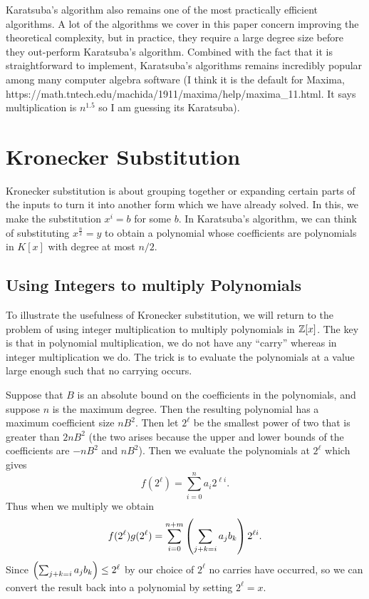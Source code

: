 Karatsuba's algorithm also remains one of the most practically efficient algorithms. A lot of the algorithms we cover in this paper concern improving the theoretical complexity, but in practice, they require a large degree size before they out-perform Karatsuba's algorithm. Combined with the fact that it is straightforward to implement, Karatsuba's algorithms remains incredibly popular among many computer algebra software (I think it is the default for Maxima, https://math.tntech.edu/machida/1911/maxima/help/maxima_11.html. It says multiplication is $n^{1.5}$ so I am guessing its Karatsuba).


\section{Kronecker Substitution}%
\label{sub:kronecker_substitution}

Kronecker substitution is about grouping together or expanding certain parts of the inputs to turn it into another form which we have already solved. In this, we make the substitution $x^i = b$ for some $b$. In Karatsuba's algorithm, we can think of substituting $x^{\frac{n}{2}} = y$ to obtain a polynomial whose coefficients are polynomials in $K[x]$ with degree at most $n/2$.

\subsection{Using Integers to multiply Polynomials}%
\label{sub:Using Integers to multiply Polynomials}

To illustrate the usefulness of Kronecker substitution, we will return to the problem of using integer multiplication to multiply polynomials in ${\mathbb Z}[x]$. The key is that in polynomial multiplication, we do not have any ``carry'' whereas in integer multiplication we do. The trick is to evaluate the polynomials at a value large enough such that no carrying occurs.

Suppose that $B$ is an absolute bound on the coefficients in the polynomials, and suppose $n$ is the maximum degree. Then the resulting polynomial has a maximum coefficient size $nB^2$. Then let $2^\ell$ be the smallest power of two that is greater than $2nB^2$ (the two arises because the upper and lower bounds of the coefficients are $-nB^2$ and $nB^2$). Then we evaluate the polynomials at $2^\ell$ which gives
\[
    f(2^\ell) = \sum^n_{i = 0} a_i 2^{\ell i}.
\]
Thus when we multiply we obtain
\[
    f(2^\ell)g(2^\ell) = \sum^{n+m}_{i=0} \left(\sum_{j + k = i} a_jb_k\right)2^{\ell i}.
\]
Since $\left(\sum_{j + k = i}a_j b_k\right) \leq 2^{\ell}$ by our choice of $2^\ell$ no carries have occurred, so we can convert the result back into a polynomial by setting $2^\ell = x$.


